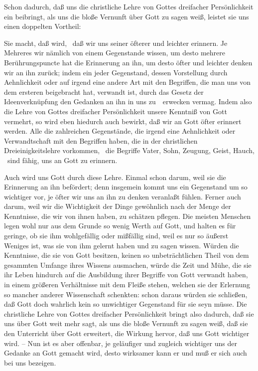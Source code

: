 \begin{aufza}
\item Schon dadurch, daß uns die christliche Lehre von Gottes dreifacher Persönlichkeit ein  beibringt, als uns die bloße Vernunft über Gott zu sagen weiß, leistet sie uns einen doppelten Vortheil:
\begin{aufzb}
\item Sie macht, daß  wird, \dh\ daß wir uns seiner öfterer und leichter erinnern. Je Mehreres wir nämlich von einem Gegenstande wissen, um desto mehrere Berührungspuncte hat die Erinnerung an ihn, um desto öfter und leichter denken wir an ihn zurück; indem ein jeder Gegenstand, dessen Vorstellung durch Aehnlichkeit oder auf irgend eine andere Art mit den Begriffen, die man uns von dem ersteren beigebracht hat, verwandt ist, durch das Gesetz der Ideenverknüpfung den Gedanken an ihn in uns zu~\ erwecken vermag. Indem also die Lehre von Gottes dreifacher Persönlichkeit unsere Kenntniß von Gott vermehrt, so wird eben hiedurch auch bewirkt, daß wir an Gott öfter erinnert werden. Alle die zahlreichen Gegenstände, die irgend eine Aehnlichkeit oder Verwandtschaft mit den Begriffen haben, die in der christlichen Dreieinigkeitslehre vorkommen, \zB\ die Begriffe Vater, Sohn, Zeugung, Geist, Hauch, \usw\, sind fähig, uns an Gott zu erinnern.
\item Auch  wird uns Gott durch diese Lehre. Einmal schon darum, weil sie die Erinnerung an ihn befördert; denn insgemein kommt uns ein Gegenstand um so wichtiger vor, je öfter wir uns an ihn zu denken veranlaßt fühlen. Ferner auch darum, weil wir die Wichtigkeit der Dinge gewöhnlich nach der Menge der Kenntnisse, die wir von ihnen haben, zu schätzen pflegen. Die meisten Menschen legen wohl nur aus dem Grunde so wenig Werth auf Gott, und halten es für geringe, ob sie ihm wohlgefällig oder mißfällig sind, weil es nur so äußerst Weniges ist, was sie von ihm gelernt haben und zu sagen wissen. Würden die Kenntnisse, die sie von Gott besitzen, keinen so unbeträchtlichen Theil von dem gesammten Umfange ihres Wissens ausmachen, würde die Zeit und Mühe, die sie ihr Leben hindurch auf die Ausbildung ihrer Begriffe von Gott verwandt haben, in einem größeren Verhältnisse mit dem Fleiße stehen, welchen sie der Erlernung so mancher anderer Wissenschaft schenkten: schon daraus würden sie schließen, daß Gott doch wahrlich kein so unwichtiger Gegenstand für sie seyn müsse. Die christliche Lehre von Gottes dreifacher Persönlichkeit bringt also dadurch, daß sie uns über Gott weit mehr sagt, als uns die bloße Vernunft zu sagen weiß, daß sie den Unterricht über Gott erweitert, die Wirkung hervor, daß uns Gott wichtiger wird. -- Nun ist es aber offenbar, je geläufiger und zugleich wichtiger uns der Gedanke an Gott gemacht wird, desto wirksamer kann er und muß er sich auch bei uns bezeigen.

\end{aufzb}
\end{aufza}
